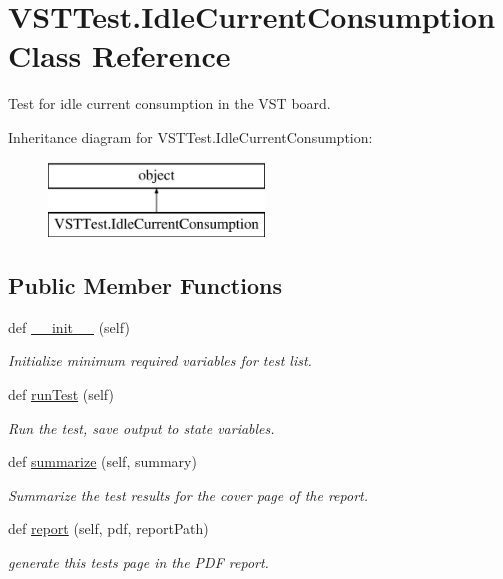 \hypertarget{class_v_s_t_test_1_1_idle_current_consumption}{}\section{V\+S\+T\+Test.\+Idle\+Current\+Consumption Class Reference}
\label{class_v_s_t_test_1_1_idle_current_consumption}


Test for idle current consumption in the V\+ST board.  


Inheritance diagram for V\+S\+T\+Test.\+Idle\+Current\+Consumption\+:\begin{figure}[H]
\begin{center}
\leavevmode
\includegraphics[height=2.000000cm]{class_v_s_t_test_1_1_idle_current_consumption}
\end{center}
\end{figure}
\subsection*{Public Member Functions}
\begin{DoxyCompactItemize}
\item 
def \hyperlink{class_v_s_t_test_1_1_idle_current_consumption_a8a0b820d03d5e6506abace8c70cd7577}{\+\_\+\+\_\+init\+\_\+\+\_\+} (self)
\begin{DoxyCompactList}\small\item\em Initialize minimum required variables for test list. \end{DoxyCompactList}\item 
def \hyperlink{class_v_s_t_test_1_1_idle_current_consumption_a39026b823531f0939cd2cd0568fdec5c}{run\+Test} (self)
\begin{DoxyCompactList}\small\item\em Run the test, save output to state variables. \end{DoxyCompactList}\item 
def \hyperlink{class_v_s_t_test_1_1_idle_current_consumption_a5c8b44240faa0975e632ce5bac14b259}{summarize} (self, summary)
\begin{DoxyCompactList}\small\item\em Summarize the test results for the cover page of the report. \end{DoxyCompactList}\item 
def \hyperlink{class_v_s_t_test_1_1_idle_current_consumption_afb740a7f4791cdf1240d84c1729fc0fc}{report} (self, pdf, report\+Path)
\begin{DoxyCompactList}\small\item\em generate this test\textquotesingle{}s page in the P\+DF report. \end{DoxyCompactList}\end{DoxyCompactItemize}


